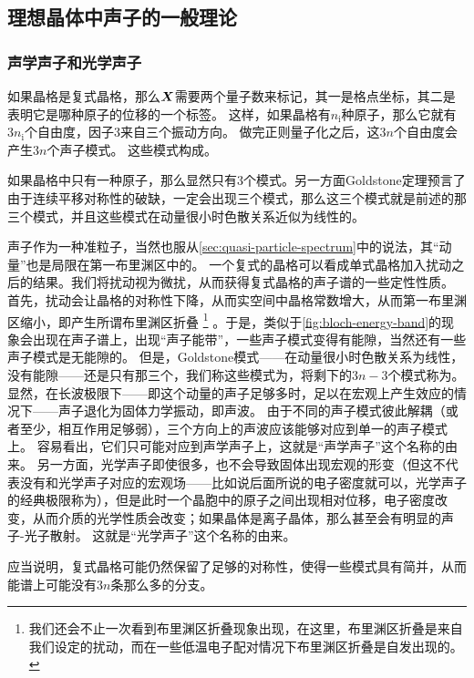 \subsection{理想晶体中声子的一般理论}

\subsubsection{声学声子和光学声子}

如果晶格是复式晶格，那么$\vb*{X}$需要两个量子数来标记，其一是格点坐标，其二是表明它是哪种原子的位移的一个标签。
这样，如果晶格有$n_\text{i}$种原子，那么它就有$3n_\text{i}$个自由度，因子$3$来自三个振动方向。
做完正则量子化之后，这$3n$个自由度会产生$3n$个声子模式。
这些模式构成。

如果晶格中只有一种原子，那么显然只有$3$个模式。另一方面Goldstone定理预言了由于连续平移对称性的破缺，一定会出现三个模式，那么这三个模式就是前述的那三个模式，并且这些模式在动量很小时色散关系近似为线性的。

声子作为一种准粒子，当然也服从\autoref{sec:quasi-particle-spectrum}中的说法，其“动量”也是局限在第一布里渊区中的。
一个复式的晶格可以看成单式晶格加入扰动之后的结果。我们将扰动视为微扰，从而获得复式晶格的声子谱的一些定性性质。
首先，扰动会让晶格的对称性下降，从而实空间中晶格常数增大，从而第一布里渊区缩小，即产生所谓布里渊区折叠%
\footnote{
    我们还会不止一次看到布里渊区折叠现象出现，在这里，布里渊区折叠是来自我们设定的扰动，而在一些低温电子配对情况下布里渊区折叠是自发出现的。
}%
。于是，类似于\autoref{fig:bloch-energy-band}的现象会出现在声子谱上，出现“声子能带”，一些声子模式变得有能隙，当然还有一些声子模式是无能隙的。
但是，Goldstone模式——在动量很小时色散关系为线性，没有能隙——还是只有那三个，我们称这些模式为，将剩下的$3n-3$个模式称为。
显然，在长波极限下——即这个动量的声子足够多时，足以在宏观上产生效应的情况下——声子退化为固体力学振动，即声波。
由于不同的声子模式彼此解耦（或者至少，相互作用足够弱），三个方向上的声波应该能够对应到单一的声子模式上。
容易看出，它们只可能对应到声学声子上，这就是“声学声子”这个名称的由来。
另一方面，光学声子即使很多，也不会导致固体出现宏观的形变（但这不代表没有和光学声子对应的宏观场——比如说后面所说的电子密度就可以，光学声子的经典极限称为），但是此时一个晶胞中的原子之间出现相对位移，电子密度改变，从而介质的光学性质会改变；如果晶体是离子晶体，那么甚至会有明显的声子-光子散射。
这就是“光学声子”这个名称的由来。

应当说明，复式晶格可能仍然保留了足够的对称性，使得一些模式具有简并，从而能谱上可能没有$3n$条那么多的分支。

